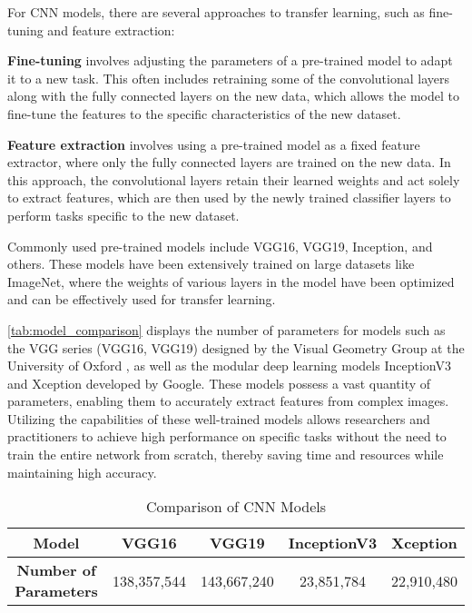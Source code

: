 For CNN models, there are several approaches to transfer learning, such as fine-tuning and feature extraction: 

\textbf{Fine-tuning} involves adjusting the parameters of a pre-trained model to adapt it to a new task. This often includes retraining some of the convolutional layers along with the fully connected layers on the new data, which allows the model to fine-tune the features to the specific characteristics of the new dataset. \cite{4.30 5}

\textbf{Feature extraction} involves using a pre-trained model as a fixed feature extractor, where only the fully connected layers are trained on the new data. In this approach, the convolutional layers retain their learned weights and act solely to extract features, which are then used by the newly trained classifier layers to perform tasks specific to the new dataset.\cite{4.30 6}


Commonly used pre-trained models include VGG16, VGG19, Inception, and others. These models have been extensively trained on large datasets like ImageNet, where the weights of various layers in the model have been optimized and can be effectively used for transfer learning.\cite{4.30 7}

\autoref{tab:model_comparison} displays the number of parameters for models such as the VGG series (VGG16, VGG19) designed by the Visual Geometry Group at the University of Oxford \cite{DL.5}, as well as the modular deep learning models InceptionV3 \cite{DL.6} and Xception \cite{DL.7} developed by Google. These models possess a vast quantity of parameters, enabling them to accurately extract features from complex images. Utilizing the capabilities of these well-trained models allows researchers and practitioners to achieve high performance on specific tasks without the need to train the entire network from scratch, thereby saving time and resources while maintaining high accuracy.\cite{4.30 8}

\begin{table}[htbp]
    \centering
    \caption{Comparison of CNN Models}
    \label{tab:model_comparison}
    \begin{tabular}{ccccc}
        \toprule
        \textbf{Model} & \textbf{VGG16} & \textbf{VGG19} & \textbf{InceptionV3} & \textbf{Xception} \\
        \midrule
        \textbf{Number of Parameters} & 138,357,544 & 143,667,240 & 23,851,784 & 22,910,480 \\
        \bottomrule
    \end{tabular}
\end{table}

